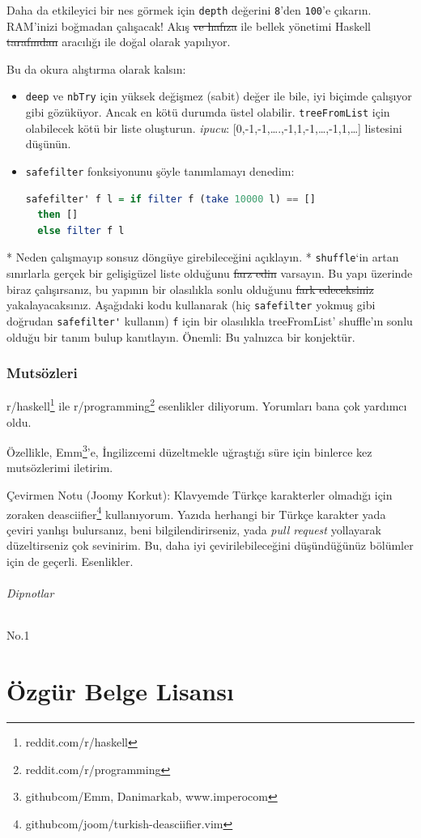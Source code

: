 \documentclass[a4paper,14pt,openany]{extbook} %
\providecommand{\tightlist}{%
  \setlength{\itemsep}{0pt}\setlength{\parskip}{0pt}}
\let\oldparagraph\paragraph
\renewcommand{\paragraph}[1]{\oldparagraph{#1}\mbox{}}
\let\emph\textit
\begin{document}
Daha da etkileyici bir nes görmek için \lstinline!depth! değerini
\lstinline!8!'den \lstinline!100!'e çıkarın. RAM'inizi boğmadan
çalışacak! Akış \st{ve hafıza} ile bellek yönetimi Haskell \st{tarafından} aracılığı ile doğal olarak
yapılıyor.

Bu da okura alıştırma olarak kalsın:

\begin{itemize} \tightlist
\item  \lstinline!deep! ve \lstinline!nbTry! için yüksek değişmez (sabit) değer ile
  bile, iyi biçimde çalışıyor gibi gözüküyor. Ancak en kötü durumda üstel
  olabilir. \lstinline!treeFromList! için olabilecek kötü bir liste
  oluşturun. \emph{ipucu}:
  {[}0,-1,-1,\ldots{}.,-1,1,-1,\ldots{},-1,1,\ldots{}{]} listesini
  düşünün.
\item  \lstinline!safefilter! fonksiyonunu şöyle tanımlamayı denedim:

  \begin{lstlisting}[language=Haskell]
  safefilter' f l = if filter f (take 10000 l) == []
  then []
  else filter f l
\end{lstlisting}
\end{itemize}

* Neden çalışmayıp sonsuz döngüye girebileceğini açıklayın.
* \lstinline!shuffle!`in artan sınırlarla gerçek bir gelişigüzel liste
olduğunu \st{farz edin} varsayın. Bu yapı üzerinde biraz çalışırsanız, bu yapının bir
olasılıkla sonlu olduğunu \st{fark edeceksiniz} yakalayacaksınız.
Aşağıdaki kodu kullanarak (hiç \lstinline!safefilter! yokmuş gibi doğrudan \lstinline!safefilter'!
kullanın) \lstinline!f! için bir olasılıkla treeFromList' shuffle'ın sonlu
olduğu bir tanım bulup kanıtlayın. Önemli: Bu yalnızca bir konjektür.

\section{Mutsözleri}\label{teux15mutsozleri}

{\color{blue} r/haskell}\footnote{reddit.com/r/haskell} ile
{\color{blue} r/programming}\footnote{reddit.com/r/programming}
esenlikler diliyorum. Yorumları bana çok yardımcı oldu.

Özellikle, Emm\footnote{github\centerdot com/Emm, Danimarkab, www.impero\centerdot com}'e, İngilizcemi
düzeltmekle uğraştığı süre için binlerce kez mutsözlerimi iletirim.

  Çevirmen Notu (Joomy Korkut): Klavyemde Türkçe karakterler olmadığı için zoraken
  deasciifier\footnote{github\centerdot com/joom/turkish-deasciifier.vim}
  kullanıyorum. Yazıda herhangi bir Türkçe karakter yada çeviri yanlışı
  bulursanız, beni bilgilendirirseniz, yada \emph{pull request} yollayarak
  düzeltirseniz çok sevinirim. Bu, daha iyi çevirilebileceğini düşündüğünüz
  bölümler için de geçerli. Esenlikler.

\paragraph{Dipnotlar}\label{dipnotlar}

No.1

\newpage

\part{Özgür Belge Lisansı}


\end{document}
